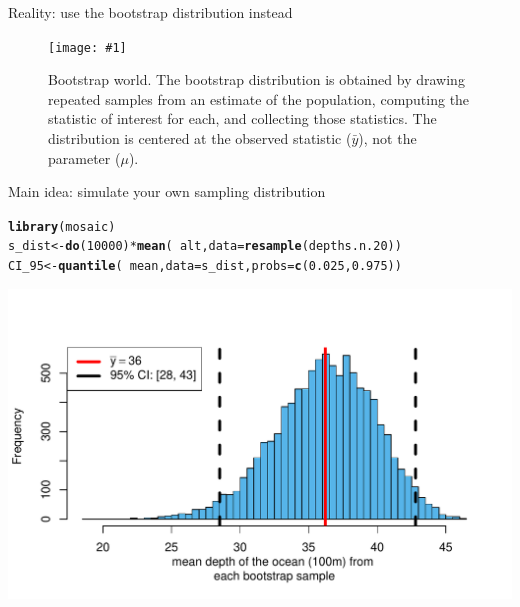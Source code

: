 \documentclass{beamer}\usepackage[]{graphicx}\usepackage[]{color}
\newcommand{\hlnum}[1]{\textcolor[rgb]{0.686,0.059,0.569}{#1}}%
\newcommand{\hlopt}[1]{\textcolor[rgb]{0,0,0}{#1}}%
\newcommand{\hlstd}[1]{\textcolor[rgb]{0.345,0.345,0.345}{#1}}%
\newcommand{\hlkwb}[1]{\textcolor[rgb]{0.69,0.353,0.396}{#1}}%
\newcommand{\hlkwc}[1]{\textcolor[rgb]{0.333,0.667,0.333}{#1}}%
\newcommand{\hlkwd}[1]{\textcolor[rgb]{0.737,0.353,0.396}{\textbf{#1}}}%
\newenvironment{knitrout}{}{} %
\newcommand {\framedgraphiccaption}[2] {
	\begin{figure}
		\centering
		\texttt{[image: \#1]}
		\caption{#2}
	\end{figure}
}
\begin{document}
\begin{frame}[fragile]{Reality: use the bootstrap distribution instead}




\framedgraphiccaption{../bootstrap/boot_diag.pdf}{\scriptsize{Bootstrap world. The bootstrap distribution is obtained by drawing repeated samples from an estimate of the population, computing the statistic of interest for each, and collecting those statistics. The distribution is centered at the observed statistic ($\bar{y}$), not the parameter ($\mu$).}}

\end{frame}


\begin{frame}[fragile]{Main idea: simulate your own sampling distribution}



\begin{knitrout}\scriptsize
{}\color{fgcolor}
\begin{alltt}
\hlkwd{library}\hlstd{(mosaic)}
\hlstd{s_dist} \hlkwb{<-} \hlkwd{do}\hlstd{(}\hlnum{10000}\hlstd{)} \hlopt{*} \hlkwd{mean}\hlstd{(} \hlopt{~} \hlstd{alt,} \hlkwc{data} \hlstd{=} \hlkwd{resample}\hlstd{(depths.n.20))}
\hlstd{CI_95} \hlkwb{<-} \hlkwd{quantile}\hlstd{(}\hlopt{~} \hlstd{mean,} \hlkwc{data} \hlstd{= s_dist,} \hlkwc{probs} \hlstd{=} \hlkwd{c}\hlstd{(}\hlnum{0.025}\hlstd{,} \hlnum{0.975}\hlstd{))}
\end{alltt}


{\centering \includegraphics[width=1\linewidth]{figure/unnamed-chunk-13-1} 

}



\end{knitrout}

\end{frame}
\end{document}

